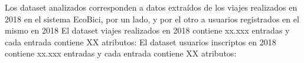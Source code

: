 Los dataset analizados corresponden a datos extraídos de los viajes realizados en 2018 en el sistema EcoBici, por un lado, y por el otro a usuarios registrados en el mismo en 2018
El dataset viajes realizados en 2018 contiene xx.xxx entradas y cada entrada contiene XX atributos: 
El dataset usuarios inscriptos en 2018 contiene xx.xxx entradas y cada entrada contiene XX atributos: